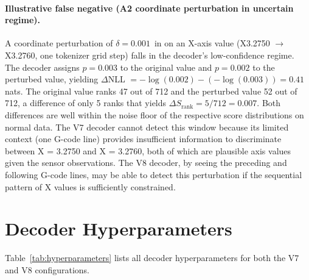 \paragraph{Illustrative false negative (A2 coordinate perturbation in uncertain regime).}
A coordinate perturbation of $\delta = 0.001$~in on an X-axis value (X3.2750 $\to$ X3.2760, one tokenizer grid step) falls in the decoder's low-confidence regime.
The decoder assigns $p = 0.003$ to the original value and $p = 0.002$ to the perturbed value, yielding $\Delta$NLL $= -\log(0.002) - (-\log(0.003)) = 0.41$ nats.
The original value ranks 47 out of 712 and the perturbed value 52 out of 712, a difference of only 5 ranks that yields $\Delta S_{\text{rank}} = 5/712 = 0.007$.
Both differences are well within the noise floor of the respective score distributions on normal data.
The V7 decoder cannot detect this window because its limited context (one G-code line) provides insufficient information to discriminate between X = 3.2750 and X = 3.2760, both of which are plausible axis values given the sensor observations.
The V8 decoder, by seeing the preceding and following G-code lines, may be able to detect this perturbation if the sequential pattern of X values is sufficiently constrained.

\section{Decoder Hyperparameters}
\label{app:hyperparameters}

Table~\ref{tab:hyperparameters} lists all decoder hyperparameters for both the V7 and V8 configurations.


